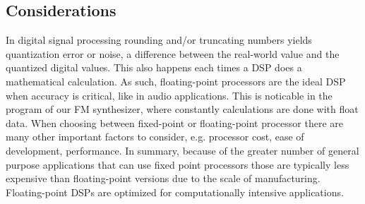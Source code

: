 \subsection{Considerations}
In digital signal processing rounding and/or truncating numbers yields quantization error or noise, a difference between the real-world value and the quantized digital values. This also happens each times a DSP does a mathematical calculation. As such, floating-point processors are the ideal DSP when accuracy is critical, like in audio applications. This is noticable in the program of our FM synthesizer, where constantly calculations are done with float data.
When choosing between fixed-point or floating-point processor there are many other important factors to consider, e.g. processor cost, ease of development, performance. In summary, because of the greater number of general purpose applications that can use fixed point processors those are typically less expensive than floating-point versions due to the scale of manufacturing. Floating-point DSPs are optimized for computationally intensive applications.
